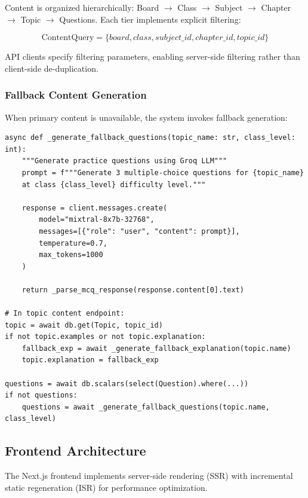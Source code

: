 \documentclass[10pt,conference,compsocconf]{IEEEtran}
\begin{document}
Content is organized hierarchically: Board $\rightarrow$ Class $\rightarrow$ Subject $\rightarrow$ Chapter $\rightarrow$ Topic $\rightarrow$ Questions. Each tier implements explicit filtering:

$$\text{ContentQuery} = \{board, class, subject\_id, chapter\_id, topic\_id\}$$

API clients specify filtering parameters, enabling server-side filtering rather than client-side de-duplication.

\subsubsection{Fallback Content Generation}

When primary content is unavailable, the system invokes fallback generation:

\begin{lstlisting}[caption=Fallback Content Generation, label=lst:fallback]
async def _generate_fallback_questions(topic_name: str, class_level: int):
    """Generate practice questions using Groq LLM"""
    prompt = f"""Generate 3 multiple-choice questions for {topic_name} 
    at class {class_level} difficulty level."""
    
    response = client.messages.create(
        model="mixtral-8x7b-32768",
        messages=[{"role": "user", "content": prompt}],
        temperature=0.7,
        max_tokens=1000
    )
    
    return _parse_mcq_response(response.content[0].text)

# In topic content endpoint:
topic = await db.get(Topic, topic_id)
if not topic.examples or not topic.explanation:
    fallback_exp = await _generate_fallback_explanation(topic.name)
    topic.explanation = fallback_exp
    
questions = await db.scalars(select(Question).where(...))
if not questions:
    questions = await _generate_fallback_questions(topic.name, class_level)
\end{lstlisting}

\subsection{Frontend Architecture}

The Next.js frontend implements server-side rendering (SSR) with incremental static regeneration (ISR) for performance optimization.
\end{document}
